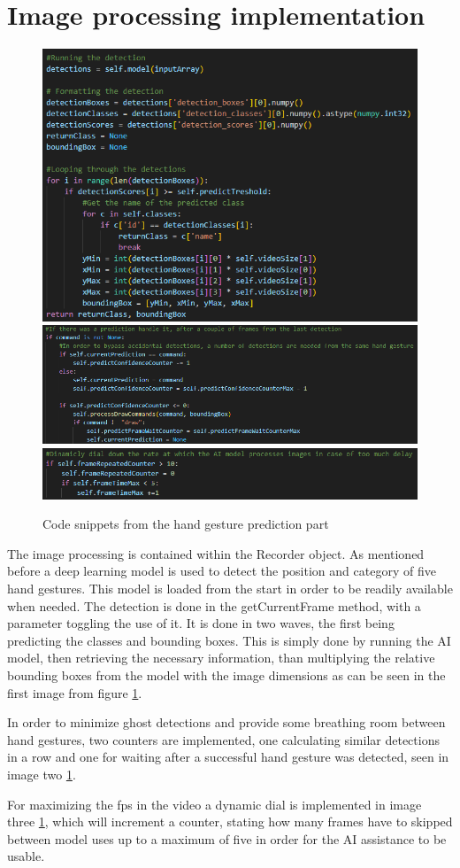 \section{Image processing implementation}
\label{sec:designsec2}

\begin{figure}
    \centering
    \includegraphics[width=0.5\linewidth]{figures/PredictionImplementation.png}
    \includegraphics[width=0.5\linewidth]{figures/ConfidanceCount.png}
    \includegraphics[width=0.4\linewidth]{figures/PredictionDialDown.png}
    \caption{Code snippets from the hand gesture prediction part}
    \label{fig:AIImplementations}
\end{figure}

\par The image processing is contained within the Recorder object. As mentioned before a deep learning model is used to detect the position and category of five hand gestures. This model is loaded from the start in order to be readily available when needed. The detection is done in the getCurrentFrame method, with a parameter toggling the use of it. It is done in two waves, the first being predicting the classes and bounding boxes. This is simply done by running the AI model, then retrieving the necessary information, than multiplying the relative bounding boxes from the model with the image dimensions as can be seen in  the first image from figure \ref{fig:AIImplementations}.
\par In order to minimize ghost detections and provide some breathing room between hand gestures, two counters are implemented, one calculating similar detections in a row and one for waiting after a successful hand gesture was detected, seen in image two \ref{fig:AIImplementations}.
\par For maximizing the fps in the video a dynamic dial is implemented in image three \ref{fig:AIImplementations}, which will increment a counter, stating how many frames have to skipped between model uses up to a maximum of five in order for the AI assistance to be usable. 

